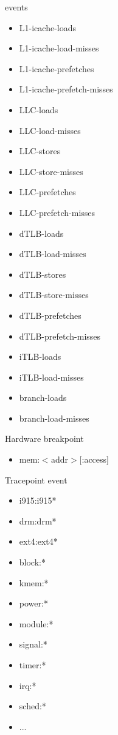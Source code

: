 \begin{frame}{events}
\begin{tiny}
\begin{multicols}{3}
\begin{itemize}
  \item L1-icache-loads
  \item L1-icache-load-misses
  \item L1-icache-prefetches
  \item L1-icache-prefetch-misses
  \item LLC-loads
  \item LLC-load-misses
  \item LLC-stores
  \item LLC-store-misses
  \item LLC-prefetches
  \item LLC-prefetch-misses
  \item dTLB-loads
  \item dTLB-load-misses
  \item dTLB-stores
  \item dTLB-store-misses
  \item dTLB-prefetches
  \item dTLB-prefetch-misses
  \item iTLB-loads
  \item iTLB-load-misses
  \item branch-loads
  \item branch-load-misses
\end{itemize}
Hardware breakpoint
\begin{itemize}
  \item mem:$<$addr$>$[:access]
\end{itemize}
Tracepoint event
\begin{itemize}
  \item i915:i915*
  \item drm:drm*
  \item ext4:ext4*
  \item block:*
  \item kmem:*
  \item power:*
  \item module:*
  \item signal:*
  \item timer:*
  \item irq:*
  \item sched:*
  \item ...
\end{itemize}
\end{multicols}
\end{tiny}
\end{frame}


